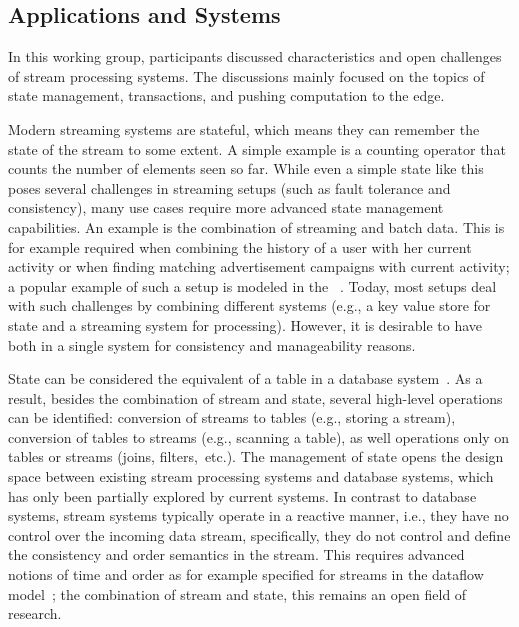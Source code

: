 \subsection{Applications and Systems}

In this working group, participants discussed characteristics and open
challenges of stream processing systems. The discussions mainly focused on
the topics of state management, transactions, and pushing computation to the edge.

 Modern streaming systems are stateful, which means they can remember the state
of the stream to some extent. A simple example is a counting operator that
counts the number of elements seen so far. While even a simple state like this
poses several challenges in streaming setups (such as fault tolerance and
consistency), many use cases require more advanced state management
capabilities. An example is the combination of streaming and batch data. This
is for example required when combining the history of a user with her current
activity or when finding matching advertisement campaigns with current activity;
a popular example of such a setup is modeled in the ~\cite{Chintapalli2016BenchmarkingSC}. Today, most setups deal with
such challenges by combining different systems (e.g., a key value store for
state and a streaming system for processing). However, it is desirable to have
both in a single system for consistency and manageability reasons.

State can be considered the equivalent of a table in a database system~\cite{arasu_babu_widom_2006}. As a
result, besides the combination of stream and state, several high-level
operations can be identified: conversion of streams to tables (e.g., storing
a stream), conversion of tables to streams (e.g., scanning a table), as well
operations only on tables or streams (joins, filters,~etc.). The management of
state opens the design space between existing stream processing systems and
data\-base systems, which has only been partially explored by current systems.
In contrast to database systems, stream systems typically operate in a reactive
manner, i.e., they have no control over the incoming data stream, specifically,
they do not control and define the consistency and order semantics in the
stream. This requires advanced notions of time and order as for example
specified for streams in the dataflow model~\cite{akidau2015dataflow};
the combination of stream and state,
this remains an open field of research.


